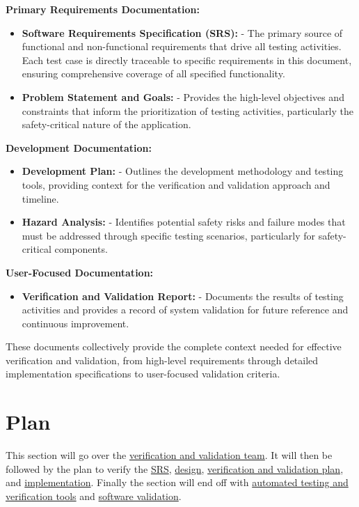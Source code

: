 \documentclass[12pt, titlepage]{article}
\begin{document}
\textbf{Primary Requirements Documentation:}
\begin{itemize}
    \item \textbf{Software Requirements Specification (SRS):} \cite{SRS} - The primary source of functional and non-functional requirements that drive all testing activities. Each test case is directly traceable to specific requirements in this document, ensuring comprehensive coverage of all specified functionality.
    
    \item \textbf{Problem Statement and Goals:} \cite{ProblemStatement} - Provides the high-level objectives and constraints that inform the prioritization of testing activities, particularly the safety-critical nature of the application.
\end{itemize}

\textbf{Development Documentation:}
\begin{itemize}
    \item \textbf{Development Plan:} \cite{DevelopmentPlan} - Outlines the development methodology and testing tools, providing context for the verification and validation approach and timeline.
    
    \item \textbf{Hazard Analysis:} \cite{HazardAnalysis} - Identifies potential safety risks and failure modes that must be addressed through specific testing scenarios, particularly for safety-critical components.
\end{itemize}

\textbf{User-Focused Documentation:}
\begin{itemize}
    \item \textbf{Verification and Validation Report:} \cite{VnVReport} - Documents the results of testing activities and provides a record of system validation for future reference and continuous improvement.
\end{itemize}

These documents collectively provide the complete context needed for effective verification and validation, from high-level requirements through detailed implementation specifications to user-focused validation criteria.

\section{Plan}

This section will go over the \hyperref[sec:vnv_team]{verification and
validation team}. It will then be followed by the plan to verify the
\hyperref[sec:srs_verification]{SRS},
\hyperref[sec:design_verification]{design}, 
\hyperref[sec:vnv_plan_verification]{verification and validation plan}, and
\hyperref[sec:implementation_verification]{implementation}. Finally the section
will end off with 
\hyperref[sec:testing_tools]{automated testing and verification tools} and
\hyperref[sec:software_validation]{software validation}.
\end{document}
